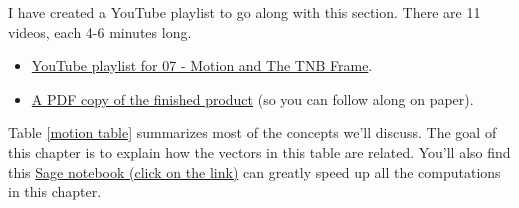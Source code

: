 I have created a YouTube playlist to go along with this section. There are 11 videos, each 4-6 minutes long.
\begin{itemize}
 \item \href{http://www.youtube.com/playlist?list=PL30EE81142B1ED1F0&feature=plcp}{YouTube playlist for 07 - Motion and The TNB Frame}.
 \item \href{http://db.tt/FmEGk9p5}{A PDF copy of the finished product} (so you can follow along on paper).
\end{itemize}
Table \ref{motion table} summarizes most of the concepts we'll discuss. The goal of this chapter is to explain how the vectors in this table are related.  You'll also find this \href{\sageurlforcurvature}{Sage notebook (click on the link)} can greatly speed up all the computations in this chapter. 

